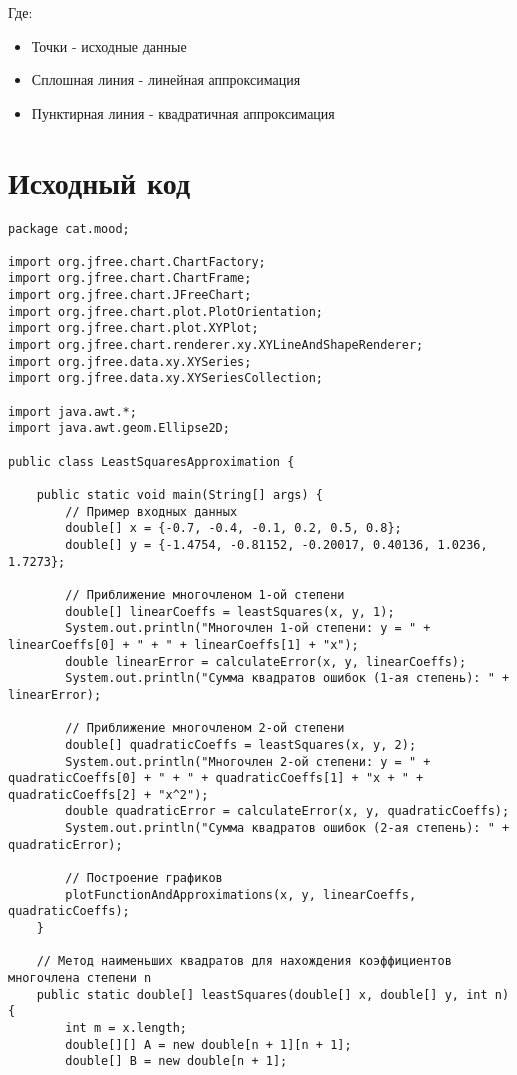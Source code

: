 \noindent Где:
\begin{itemize}
\item Точки - исходные данные
\item Сплошная линия - линейная аппроксимация
\item Пунктирная линия - квадратичная аппроксимация
\end{itemize}

\section*{Исходный код}

\begin{verbatim}
package cat.mood;

import org.jfree.chart.ChartFactory;
import org.jfree.chart.ChartFrame;
import org.jfree.chart.JFreeChart;
import org.jfree.chart.plot.PlotOrientation;
import org.jfree.chart.plot.XYPlot;
import org.jfree.chart.renderer.xy.XYLineAndShapeRenderer;
import org.jfree.data.xy.XYSeries;
import org.jfree.data.xy.XYSeriesCollection;

import java.awt.*;
import java.awt.geom.Ellipse2D;

public class LeastSquaresApproximation {

    public static void main(String[] args) {
        // Пример входных данных
        double[] x = {-0.7, -0.4, -0.1, 0.2, 0.5, 0.8};
        double[] y = {-1.4754, -0.81152, -0.20017, 0.40136, 1.0236, 1.7273};

        // Приближение многочленом 1-ой степени
        double[] linearCoeffs = leastSquares(x, y, 1);
        System.out.println("Многочлен 1-ой степени: y = " + linearCoeffs[0] + " + " + linearCoeffs[1] + "x");
        double linearError = calculateError(x, y, linearCoeffs);
        System.out.println("Сумма квадратов ошибок (1-ая степень): " + linearError);

        // Приближение многочленом 2-ой степени
        double[] quadraticCoeffs = leastSquares(x, y, 2);
        System.out.println("Многочлен 2-ой степени: y = " + quadraticCoeffs[0] + " + " + quadraticCoeffs[1] + "x + " + quadraticCoeffs[2] + "x^2");
        double quadraticError = calculateError(x, y, quadraticCoeffs);
        System.out.println("Сумма квадратов ошибок (2-ая степень): " + quadraticError);

        // Построение графиков
        plotFunctionAndApproximations(x, y, linearCoeffs, quadraticCoeffs);
    }

    // Метод наименьших квадратов для нахождения коэффициентов многочлена степени n
    public static double[] leastSquares(double[] x, double[] y, int n) {
        int m = x.length;
        double[][] A = new double[n + 1][n + 1];
        double[] B = new double[n + 1];


\end{verbatim}

